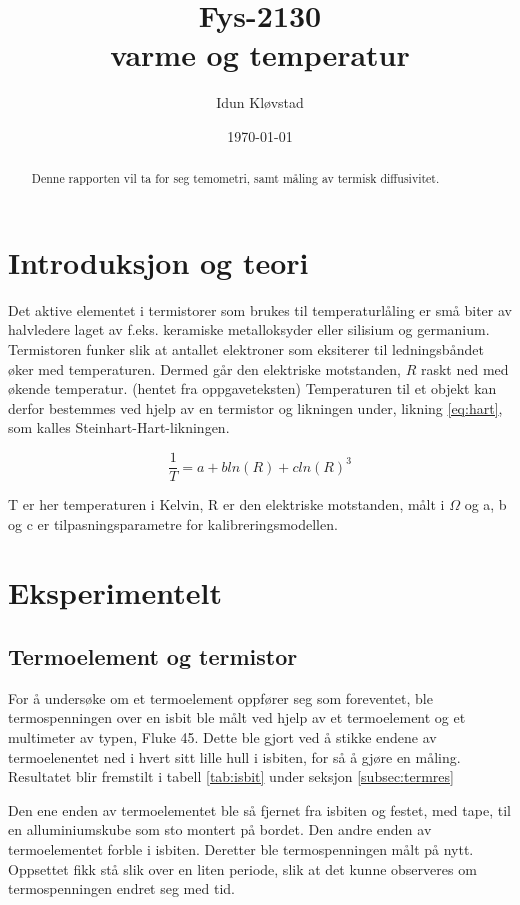 \documentclass[a4paper,norsk,12pt,oneside]{article}
\title{Fys-2130\\ varme og temperatur}
\author{Idun Kløvstad}
\date{\today}
\begin{document}
\maketitle
\newpage

\begin{abstract}
    Denne rapporten vil ta for seg temometri, samt måling av termisk diffusivitet. 
\end{abstract}

\section{Introduksjon og teori}

Det aktive elementet i termistorer som brukes til temperaturlåling er små biter av 
halvledere laget av f.eks. keramiske metalloksyder eller silisium og germanium. 
Termistoren funker slik at antallet elektroner som eksiterer til ledningsbåndet øker med 
temperaturen. Dermed går den elektriske motstanden, \(R\) raskt ned med økende temperatur. 
(hentet fra oppgaveteksten) 
Temperaturen til et objekt kan derfor bestemmes ved hjelp av en termistor og likningen 
under, likning \ref{eq:hart}, som kalles Steinhart-Hart-likningen. 

\begin{equation}\label{eq:hart}
    \frac{1}{T} = a + bln(R) + cln(R)^3
\end{equation} 

T er her temperaturen i Kelvin, R er den elektriske motstanden, målt i \(\Omega\) og a, b og c er tilpasningsparametre for kalibreringsmodellen. 

\section{Eksperimentelt}

\subsection{Termoelement og termistor}\label{subsec:termterm}

For å undersøke om et termoelement oppfører seg som foreventet, ble termospenningen over 
en isbit ble målt ved hjelp av et termoelement og et multimeter av typen, Fluke 45. Dette 
ble gjort ved å stikke endene av termoelenentet ned i hvert sitt 
lille hull i isbiten, for så å gjøre en måling. Resultatet blir fremstilt i tabell 
\ref{tab:isbit} under seksjon 
\ref{subsec:termres} 

Den ene enden av termoelementet ble så fjernet fra isbiten og festet, med tape, til en 
alluminiumskube som sto montert på bordet. Den andre enden av termoelementet forble i 
isbiten. Deretter ble termospenningen målt på nytt. Oppsettet fikk stå slik over en liten 
periode, slik at det kunne observeres om termospenningen endret seg med tid.  
\end{document}

